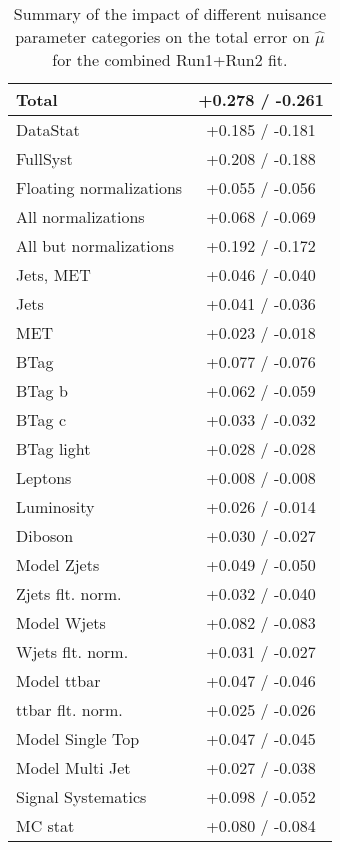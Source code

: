 \begin{table}[!htbp]\captionsetup{justification=centering}
\begin{center}\begin{tabular}{|l|c|}
\hline
Total & +0.278 / -0.261 \\\hline
DataStat & +0.185 / -0.181 \\
FullSyst & +0.208 / -0.188 \\\hline
Floating normalizations & +0.055 / -0.056 \\
All normalizations & +0.068 / -0.069 \\
All but normalizations & +0.192 / -0.172 \\
Jets, MET & +0.046 / -0.040 \\
Jets & +0.041 / -0.036 \\
MET & +0.023 / -0.018 \\
BTag & +0.077 / -0.076 \\
BTag b & +0.062 / -0.059 \\
BTag c & +0.033 / -0.032 \\
BTag light & +0.028 / -0.028 \\
Leptons & +0.008 / -0.008 \\
Luminosity & +0.026 / -0.014 \\
Diboson &  +0.030 / -0.027 \\
Model Zjets & +0.049 / -0.050 \\
Zjets flt. norm. & +0.032 / -0.040 \\
Model Wjets & +0.082 / -0.083 \\
Wjets flt. norm. & +0.031 / -0.027 \\
Model ttbar & +0.047 / -0.046 \\
ttbar flt. norm. & +0.025 / -0.026 \\
Model Single Top & +0.047 / -0.045 \\
Model Multi Jet & +0.027 / -0.038 \\
Signal Systematics & +0.098 / -0.052 \\
MC stat & +0.080 / -0.084 \\
\hline
\end{tabular}
\caption{Summary of the impact of different nuisance parameter categories on the total error on $\hat{\mu}$ for the combined Run1+Run2 fit.}
\label{tab:combbreakdown}
\end{center}
\end{table}

